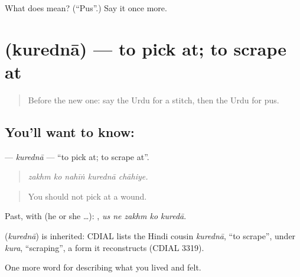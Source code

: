 \begin{tcolorbox}[breakable,colback=teal!4,colframe=teal!35!black,title={Before you move on}]
What does  mean? (\textquotedblleft{}Pus\textquotedblright{}.) Say it once more.
\end{tcolorbox}
\section[\texorpdfstring{\ur{کریدنا} (kurednā)}{کریدنا (kurednā)}]{ (kurednā) — to pick at; to scrape at}

\label{lesson:UR-C478-kuredna}



\begin{quote}
Before the new one: say the Urdu for a stitch, then the Urdu for pus.
\end{quote}

\subsection*{You'll want to know: }
\textbf{} — \emph{kurednā} — \textquotedblleft{}to pick at; to scrape at\textquotedblright{}.

\begin{quote}
    
\end{quote}

\begin{quote}
\emph{zakhm ko nahīṅ kurednā chāhiye.}
\end{quote}

\begin{quote}
You should not pick at a wound.
\end{quote}

Past, with  (he or she …):     , \emph{us ne zakhm ko kuredā}.

\begin{cousinweb}
\textbf{} (\emph{kurednā}) is inherited: CDIAL lists the Hindi cousin \emph{kurednā}, \textquotedblleft{}to scrape\textquotedblright{}, under \emph{kura}, \textquotedblleft{}scraping\textquotedblright{}, a form it reconstructs (CDIAL 3319).
\end{cousinweb}

\begin{grammarlens}[title={What you've built}]
One more word for describing what you lived and felt.
\end{grammarlens}

